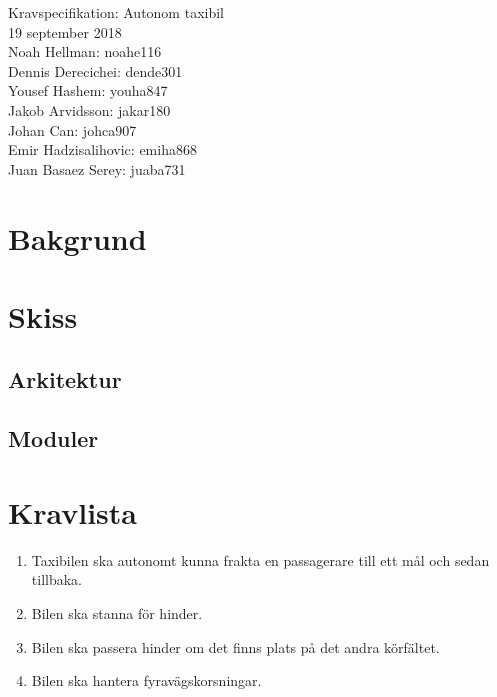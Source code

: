 \documentclass[12pt]{article}
\date{\today}
\begin{document}
\begin{center}
\vspace*{15mm}
{\Huge Kravspecifikation: Autonom taxibil}\\
\vspace{15mm}
{\large 19 september 2018}\\
\vspace{15mm}
Noah Hellman: noahe116 \\
Dennis Derecichei: dende301 \\
Yousef Hashem: youha847 \\
Jakob Arvidsson: jakar180 \\
Johan Can: johca907 \\
Emir Hadzisalihovic: emiha868 \\
Juan Basaez Serey: juaba731
\end{center}

\vspace{2cm}
\tableofcontents
\newpage

\section{Bakgrund}

\section{Skiss}
\subsection{Arkitektur}
\subsection{Moduler}

\section{Kravlista}
\begin{enumerate}
    \item Taxibilen ska autonomt kunna frakta en passagerare till ett mål och
        sedan tillbaka.
    \item Bilen ska stanna för hinder.
    \item Bilen ska passera hinder om det finns plats på det andra
        körfältet.
    \item Bilen ska hantera fyravägskorsningar.
\end{enumerate}
\end{document}
